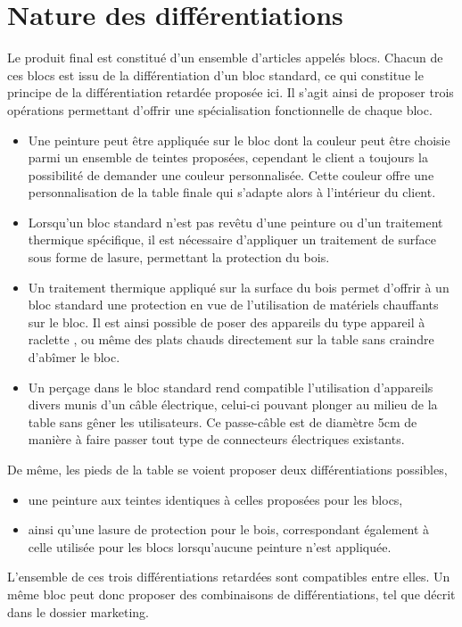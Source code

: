 \section{Nature des différentiations}

Le produit final est constitué d'un ensemble d'articles appelés blocs.
Chacun de ces blocs est issu de la différentiation d'un bloc standard,
ce qui constitue le principe de la différentiation retardée proposée ici.
Il s'agit ainsi de proposer trois opérations permettant d'offrir une
spécialisation fonctionnelle de chaque bloc.
\begin{itemize}
	\item Une peinture peut être appliquée sur le bloc
	dont la couleur peut être choisie parmi un ensemble de teintes proposées,
	cependant le client a toujours la possibilité de demander une couleur
	personnalisée. Cette couleur offre une personnalisation de la table finale
	qui s'adapte alors à l'intérieur du client.
	
	\item Lorsqu'un bloc standard n'est pas revêtu d'une peinture ou d'un
	traitement thermique spécifique, il est nécessaire d'appliquer un
	traitement de surface sous forme de lasure,
	permettant la protection du bois.
	
	\item Un traitement thermique appliqué sur la surface du bois permet
	d'offrir à un bloc standard une protection en vue de l'utilisation
	de matériels chauffants sur le bloc. Il est ainsi possible de poser
	des appareils du type \og appareil à raclette \fg{}, ou même des plats
	chauds directement sur la table sans craindre d'abîmer le bloc.
	
	\item Un perçage dans le bloc standard rend compatible l'utilisation
	d'appareils divers munis d'un câble électrique, celui-ci pouvant
	plonger au milieu de la table sans gêner les utilisateurs.
	Ce passe-câble est de diamètre 5cm de manière à faire passer tout type
	de connecteurs électriques existants.
	
\end{itemize}

De même, les pieds de la table se voient proposer deux différentiations
possibles,
\begin{itemize}
	\item une peinture aux teintes identiques à celles proposées 
	pour les blocs,
	\item ainsi qu'une lasure de protection pour le bois, correspondant
	également à celle utilisée pour les blocs lorsqu'aucune peinture
	n'est appliquée. 
\end{itemize}

L'ensemble de ces trois différentiations retardées sont compatibles
entre elles. Un même bloc peut donc proposer des combinaisons de
différentiations, tel que décrit dans le dossier marketing.
